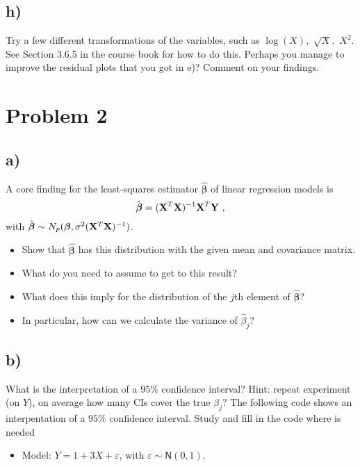 \documentclass[]{article}
\providecommand{\tightlist}{%
  \setlength{\itemsep}{0pt}\setlength{\parskip}{0pt}}
\begin{document}
\hypertarget{h}{%
\subsection{h)}\label{h}}

Try a few different transformations of the variables, such as
\(\log(X),\) \(\sqrt{X},\) \(X^2\). See Section 3.6.5 in the course book
for how to do this. Perhaps you manage to improve the residual plots
that you got in e)? Comment on your findings.

\hypertarget{problem-2}{%
\section{Problem 2}\label{problem-2}}

\hypertarget{a-1}{%
\subsection{a)}\label{a-1}}

A core finding for the least-squares estimator
\(\hat{\boldsymbol\beta}\) of linear regression models is
\[ \hat{\boldsymbol\beta}=({\bf X}^T{\bf X})^{-1} {\bf X}^T {\bf Y} \ , \]
with
\(\hat{\boldsymbol\beta}\sim N_{p}(\boldsymbol\beta,\sigma^2({\bf X}^T{\bf X})^{-1})\).

\begin{itemize}
\tightlist
\item
  Show that \(\hat{\boldsymbol\beta}\) has this distribution with the
  given mean and covariance matrix.
\item
  What do you need to assume to get to this result?
\item
  What does this imply for the distribution of the \(j\)th element of
  \(\hat{\boldsymbol\beta}\)?
\item
  In particular, how can we calculate the variance of \(\hat{\beta}_j\)?
\end{itemize}

\hypertarget{b-1}{%
\subsection{b)}\label{b-1}}

What is the interpretation of a 95\% confidence interval? Hint: repeat
experiment (on \(Y\)), on average how many CIs cover the true
\(\beta_j\)? The following code shows an interpentation of a \(95\%\)
confidence interval. Study and fill in the code where is needed

\begin{itemize}
\tightlist
\item
  Model: \(Y = 1 + 3X + \varepsilon\), with
  \(\varepsilon \sim \mathsf{N}(0,1)\).
\end{itemize}
\end{document}
